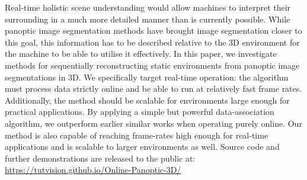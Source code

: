 
Real-time holistic scene understanding would allow machines to interpret their surrounding in a much more detailed manner than is currently possible. While panoptic image segmentation methods have brought image segmentation closer to this goal, this information has to be described relative to the 3D environment for the machine to be able to utilise it effectively. In this paper, we investigate methods for sequentially reconstructing static environments from panoptic image segmentations in 3D. We specifically target real-time operation: the algorithm must process data strictly online and be able to run at relatively fast frame rates. Additionally, the method should be scalable for environments large enough for practical applications. By applying a simple but powerful data-association algorithm, we outperform earlier similar works when operating purely online. Our method is also capable of reaching frame-rates high enough for real-time applications and is scalable to larger environments as well. Source code and further demonstrations are released to the public at: \url{https://tutvision.github.io/Online-Panoptic-3D/}
